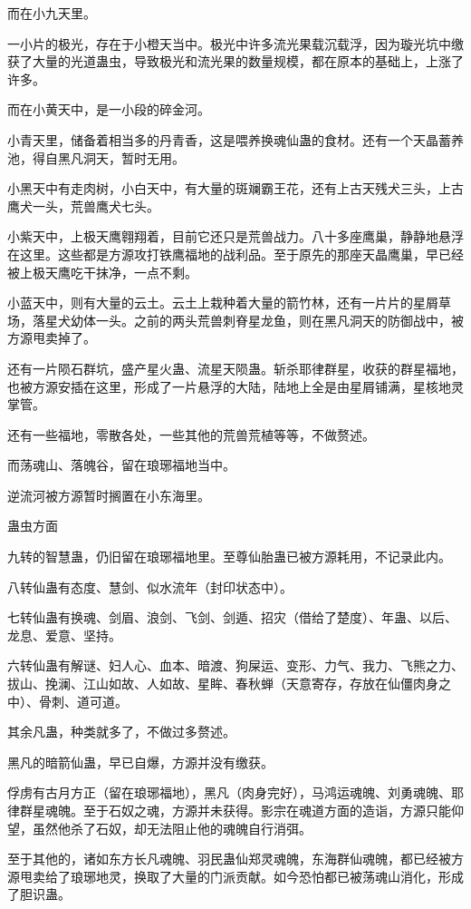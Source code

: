 \begin{this_body}
而在小九天里。

一小片的极光，存在于小橙天当中。极光中许多流光果载沉载浮，因为璇光坑中缴获了大量的光道蛊虫，导致极光和流光果的数量规模，都在原本的基础上，上涨了许多。

而在小黄天中，是一小段的碎金河。

小青天里，储备着相当多的丹青香，这是喂养换魂仙蛊的食材。还有一个天晶蓄养池，得自黑凡洞天，暂时无用。

小黑天中有走肉树，小白天中，有大量的斑斓霸王花，还有上古天残犬三头，上古鹰犬一头，荒兽鹰犬七头。

小紫天中，上极天鹰翱翔着，目前它还只是荒兽战力。八十多座鹰巢，静静地悬浮在这里。这些都是方源攻打铁鹰福地的战利品。至于原先的那座天晶鹰巢，早已经被上极天鹰吃干抹净，一点不剩。

小蓝天中，则有大量的云土。云土上栽种着大量的箭竹林，还有一片片的星屑草场，落星犬幼体一头。之前的两头荒兽刺脊星龙鱼，则在黑凡洞天的防御战中，被方源甩卖掉了。

还有一片陨石群坑，盛产星火蛊、流星天陨蛊。斩杀耶律群星，收获的群星福地，也被方源安插在这里，形成了一片悬浮的大陆，陆地上全是由星屑铺满，星核地灵掌管。

还有一些福地，零散各处，一些其他的荒兽荒植等等，不做赘述。

而荡魂山、落魄谷，留在琅琊福地当中。

逆流河被方源暂时搁置在小东海里。

蛊虫方面

九转的智慧蛊，仍旧留在琅琊福地里。至尊仙胎蛊已被方源耗用，不记录此内。

八转仙蛊有态度、慧剑、似水流年（封印状态中）。

七转仙蛊有换魂、剑眉、浪剑、飞剑、剑遁、招灾（借给了楚度）、年蛊、以后、龙息、爱意、坚持。

六转仙蛊有解谜、妇人心、血本、暗渡、狗屎运、变形、力气、我力、飞熊之力、拔山、挽澜、江山如故、人如故、星眸、春秋蝉（天意寄存，存放在仙僵肉身之中）、骨刺、道可道。

其余凡蛊，种类就多了，不做过多赘述。

黑凡的暗箭仙蛊，早已自爆，方源并没有缴获。

俘虏有古月方正（留在琅琊福地），黑凡（肉身完好），马鸿运魂魄、刘勇魂魄、耶律群星魂魄。至于石奴之魂，方源并未获得。影宗在魂道方面的造诣，方源只能仰望，虽然他杀了石奴，却无法阻止他的魂魄自行消弭。

至于其他的，诸如东方长凡魂魄、羽民蛊仙郑灵魂魄，东海群仙魂魄，都已经被方源甩卖给了琅琊地灵，换取了大量的门派贡献。如今恐怕都已被荡魂山消化，形成了胆识蛊。


\end{this_body}
